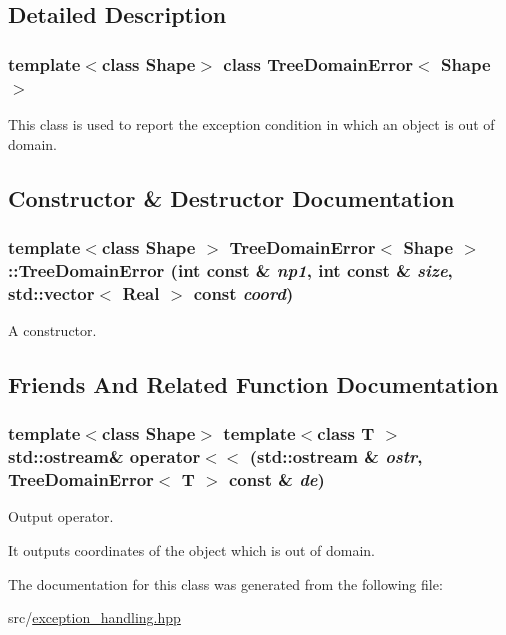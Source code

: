 \subsection{Detailed Description}
\subsubsection*{template$<$class Shape$>$ class TreeDomainError$<$ Shape $>$}

This class is used to report the exception condition in which an object is out of domain. 

\subsection{Constructor \& Destructor Documentation}
\hypertarget{classTreeDomainError_a36c6d072485354991aa96f295f545f2c}{
\subsubsection[{TreeDomainError}]{\setlength{\rightskip}{0pt plus 5cm}template$<$class Shape $>$ {\bf TreeDomainError}$<$ Shape $>$::{\bf TreeDomainError} (int const \& {\em np1}, \/  int const \& {\em size}, \/  std::vector$<$ Real $>$ const  {\em coord})}}
\label{classTreeDomainError_a36c6d072485354991aa96f295f545f2c}
A constructor. 

\subsection{Friends And Related Function Documentation}
\hypertarget{classTreeDomainError_a25d8eeca1719586bbbaeac6a01aa178b}{
\subsubsection[{operator$<$$<$}]{\setlength{\rightskip}{0pt plus 5cm}template$<$class Shape$>$ template$<$class T $>$ std::ostream\& operator$<$$<$ (std::ostream \& {\em ostr}, \/  {\bf TreeDomainError}$<$ T $>$ const \& {\em de})}}
\label{classTreeDomainError_a25d8eeca1719586bbbaeac6a01aa178b}
Output operator.

It outputs coordinates of the object which is out of domain. 

The documentation for this class was generated from the following file:\begin{DoxyCompactItemize}
\item 
src/\hyperlink{exception__handling_8hpp}{exception\_\-handling.hpp}\end{DoxyCompactItemize}
